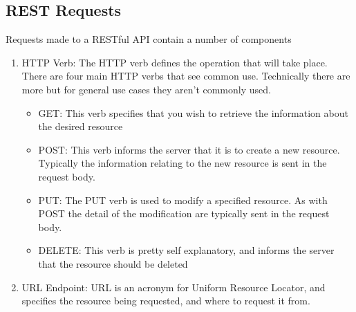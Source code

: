 \subsection{REST Requests}
Requests made to a RESTful API contain a number of components
\begin{enumerate}
\item{HTTP Verb: The HTTP verb defines the operation that will take place. There are four main HTTP verbs that see common use. Technically there are more but for general use cases they aren't commonly used.}
\begin{itemize}
    \item GET: This verb specifies that you wish to retrieve the information about the desired resource
    \item POST: This verb informs the server that it is to create a new resource. Typically the information relating to the new resource is sent in the request body.
    \item PUT: The PUT verb is used to modify a specified resource. As with POST the detail of the modification are typically sent in the request body.
    \item DELETE: This verb is pretty self explanatory, and informs the server that the resource should be deleted
\end{itemize}
\item{URL Endpoint: URL is an acronym for Uniform Resource Locator, and specifies the resource being requested, and where to request it from.

}
\end{enumerate}
